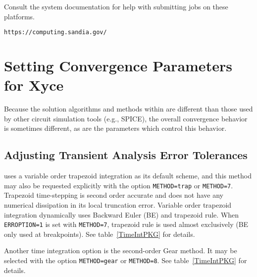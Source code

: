 Consult the system documentation for help with submitting jobs on
these platforms.

\verb+https://computing.sandia.gov/+

\chapter{Setting Convergence Parameters for Xyce}
\label{Conv_Guidelines}

Because the solution algorithms and methods within \Xyce{} are different than
those used by other circuit simulation tools (e.g., SPICE), the overall
convergence behavior is sometimes different, as are the parameters which control
this behavior.

\section{Adjusting Transient Analysis Error Tolerances}

\Xyce{} uses a variable order trapezoid integration as its default
scheme, and this method may also be requested explicitly with the
 option \texttt{METHOD=trap} or
\texttt{METHOD=7}. Trapezoid time-stepping is second order accurate
and does not have any numerical dissipation in its local truncation
error. Variable order trapezoid integration dynamically uses Backward
Euler (BE) and trapezoid rule. When \texttt{ERROPTION=1} is set with
\texttt{METHOD=7}, trapezoid rule is used almost exclusively (BE
only used at breakpoints). See table~\ref{TimeIntPKG} for details.

Another time integration option is the second-order Gear method.  It
may be selected with the  option \texttt{METHOD=gear} or
\texttt{METHOD=8}. See table~\ref{TimeIntPKG} for details.

